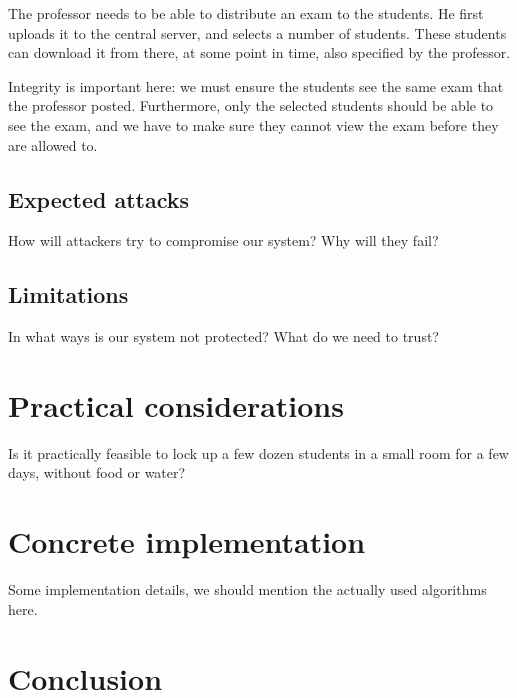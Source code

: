 \documentclass{article}
\begin{document}
The professor needs to be able to distribute an exam to the students. He first
uploads it to the central server, and selects a number of students. These
students can download it from there, at some point in time, also specified by
the professor.

Integrity is important here: we must ensure the students see the same exam that
the professor posted. Furthermore, only the selected students should be able to
see the exam, and we have to make sure they cannot view the exam before they are
allowed to.

\subsection{Expected attacks}

How will attackers try to compromise our system? Why will they fail?

\subsection{Limitations}

In what ways is our system not protected? What do we need to trust?

\section{Practical considerations}

Is it practically feasible to lock up a few dozen students in a small room for a
few days, without food or water?

\section{Concrete implementation}

Some implementation details, we should mention the actually used algorithms
here.

\section{Conclusion}
\end{document}
